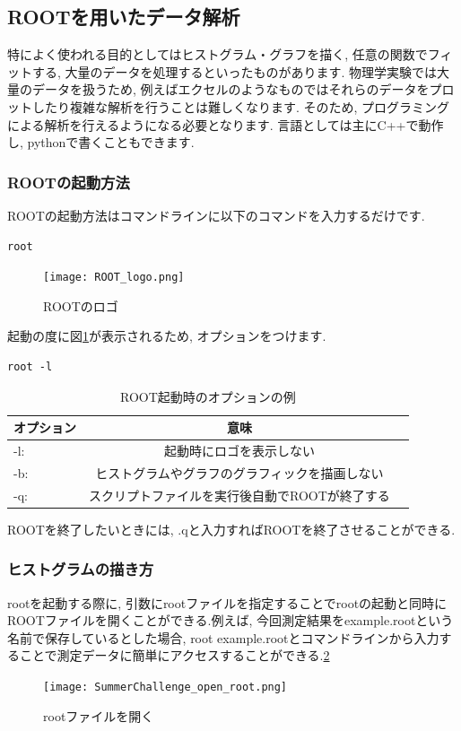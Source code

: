 \subsection{ROOTを用いたデータ解析}
特によく使われる目的としてはヒストグラム・グラフを描く, 任意の関数でフィットする, 大量のデータを処理するといったものがあります.
物理学実験では大量のデータを扱うため, 例えばエクセルのようなものではそれらのデータをプロットしたり複雑な解析を行うことは難しくなります.
そのため, プログラミングによる解析を行えるようになる必要となります.
言語としては主にC++で動作し, pythonで書くこともできます.

\subsubsection{ROOTの起動方法}
ROOTの起動方法はコマンドラインに以下のコマンドを入力するだけです.
\begin{lstlisting}
root
\end{lstlisting}
\begin{figure}[ht]
  \begin{center}
    \texttt{[image: ROOT\_logo.png]}
    \caption{ROOTのロゴ}
    \label{fig:ROOT_logo}
  \end{center}
\end{figure}
起動の度に図\ref{fig:ROOT_logo}が表示されるため, オプションをつけます.
\begin{lstlisting}
root -l
\end{lstlisting}
\begin{table}[ht]
  \caption{ROOT起動時のオプションの例}
  \centering
  \begin{tabular}{lcr}
    \hline
    オプション & 意味                                           \\
    \hline \hline
    -l:        & 起動時にロゴを表示しない                       \\
    -b:        & ヒストグラムやグラフのグラフィックを描画しない \\
    -q:        & スクリプトファイルを実行後自動でROOTが終了する \\
    \hline
  \end{tabular}
\end{table}
ROOTを終了したいときには, .qと入力すればROOTを終了させることができる.

\subsubsection{ヒストグラムの描き方}
rootを起動する際に, 引数にrootファイルを指定することでrootの起動と同時にROOTファイルを開くことができる.例えば, 今回測定結果をexample.rootという名前で保存しているとした場合, root example.rootとコマンドラインから入力することで測定データに簡単にアクセスすることができる.\ref{fig:open_ROOT}
\begin{figure}[h]
  \begin{center}
    \texttt{[image: SummerChallenge\_open\_root.png]}
    \caption{rootファイルを開く}
    \label{fig:open_ROOT}
  \end{center}
\end{figure}


